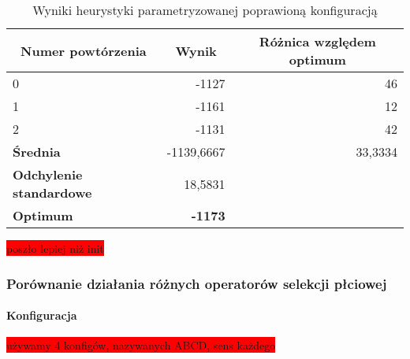 \documentclass[twoside]{iisthesis}
\newcommand{\todo}{\colorbox{red}}
\begin{document}
\begin{table}[h]
	\caption{Wyniki heurystyki parametryzowanej poprawioną konfiguracją \label{knapsack_tweak_results}}
	\begin{tabular}{|l|r|r}
		\hline
		\multicolumn{1}{|c|}{{\bf Numer powtórzenia}} & \multicolumn{1}{c|}{{\bf Wynik}} & \multicolumn{1}{c|}{{\bf Różnica względem optimum}} \\ \hline  \hline
		0                                             & -1127                            & \multicolumn{1}{r|}{46}                             \\ \hline
		1                                             & -1161                            & \multicolumn{1}{r|}{12}                             \\ \hline
		2                                             & -1131                            & \multicolumn{1}{r|}{42}                             \\ \hline \hline
		{\bf Średnia}                                 & -1139,6667                       & \multicolumn{1}{r|}{33,3334}                        \\ \hline
		{\bf Odchylenie standardowe}                  & 18,5831                          &                                                     \\ \hhline{==~}
		{\bf Optimum}                                 & {\bf -1173}                      &                                                     \\ \cline{1-2}
	\end{tabular}
\end{table}

\todo{poszło lepiej niż init}

\subsubsection{Porównanie działania różnych operatorów selekcji płciowej}

\paragraph{Konfiguracja}
\todo{używamy 4 konfigów, nazywanych ABCD, sens każdego}
\end{document}
